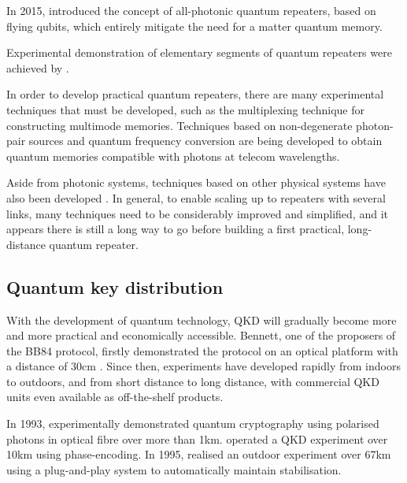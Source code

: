 \documentclass[aps, rmp, twocolumn, amsmath, amssymb, nofootinbib, superscriptaddress, longbibliography, floatfix, table-of-contents, eqsecnum]{revtex4-1}
\begin{document}
In 2015, \cite{ncomms7787} introduced the concept of all-photonic quantum repeaters, based on flying qubits, which entirely mitigate the need for a matter quantum memory. 

Experimental demonstration of elementary segments of quantum repeaters were achieved by \cite{bib:Sc_316_1316, bib:Nat_454_1098}.

In order to develop practical quantum repeaters, there are many experimental techniques that must be developed, such as the multiplexing technique \cite{bib:PRA_76_050301, bib:PRA_82_010304, bib:PRL_113_053603, bib:PRL_98_060502} for constructing multimode memories. Techniques based on non-degenerate photon-pair sources \cite{bib:Nat_469_508, bib:Nat_469_512, bib:PRL_112_040504, bib:PRA_92_012329} and quantum frequency conversion \cite{bib:NP_6_894, bib:NC_5_3376} are being developed to obtain quantum memories compatible with photons at telecom wavelengths.

Aside from photonic systems, techniques based on other physical systems have also been developed \cite{bib:NP_11_37, bib:Sc_337_72, bib:N_484_195, bib:N_497_86}. In general, to enable scaling up to repeaters with several links, many techniques need to be considerably improved and simplified, and it appears there is still a long way to go before building a first practical, long-distance quantum repeater.

%
%

\subsection{Quantum key distribution} 

With the development of quantum technology, QKD will gradually become more and more practical and economically accessible. Bennett, one of the proposers of the BB84 protocol, firstly demonstrated the protocol on an optical platform with a distance of 30cm \cite{bib:JC_5_3}. Since then, experiments have developed rapidly from indoors to outdoors, and from short distance to long distance, with commercial QKD units even available as off-the-shelf products.

In 1993, \cite{bib:EL_23_383} experimentally demonstrated quantum cryptography using polarised photons in optical fibre over more than 1km. \cite{bib:EL_29_634} operated a QKD experiment over 10km using phase-encoding. In 1995, \cite{bib:Arx0203118} realised an outdoor experiment over 67km using a plug-and-play system to automatically maintain stabilisation.
\end{document}
